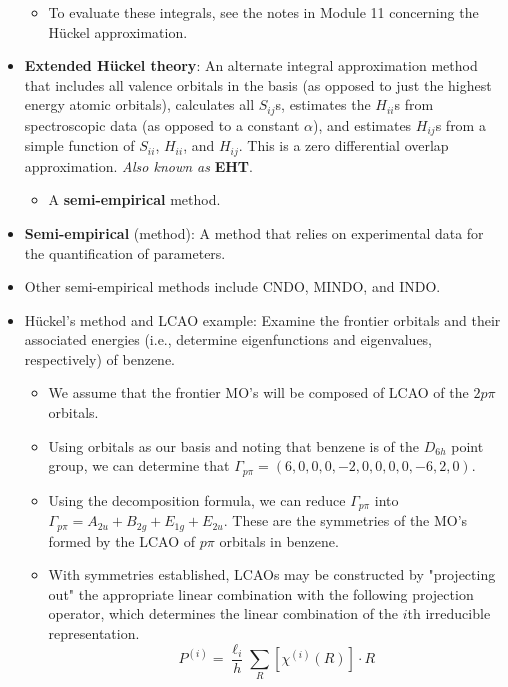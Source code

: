 \documentclass[../notes.tex]{subfiles}
\begin{document}
\begin{itemize}
\begin{itemize}
        \item To evaluate these integrals, see the notes in Module 11 concerning the H\"{u}ckel approximation.
    \end{itemize}
    \item \textbf{Extended H\"{u}ckel theory}: An alternate integral approximation method that includes all valence orbitals in the basis (as opposed to just the highest energy atomic orbitals), calculates all $S_{ij}$s, estimates the $H_{ii}$s from spectroscopic data (as opposed to a constant $\alpha$), and estimates $H_{ij}$s from a simple function of $S_{ii}$, $H_{ii}$, and $H_{ij}$. This is a zero differential overlap approximation. \emph{Also known as} \textbf{EHT}.
    \begin{itemize}
        \item A \textbf{semi-empirical} method.
    \end{itemize}
    \item \textbf{Semi-empirical} (method): A method that relies on experimental data for the quantification of parameters.
    \item Other semi-empirical methods include CNDO, MINDO, and INDO.
    \item H\"{u}ckel's method and LCAO example: Examine the frontier orbitals and their associated energies (i.e., determine eigenfunctions and eigenvalues, respectively) of benzene.
    \begin{itemize}
        \item We assume that the frontier MO's will be composed of LCAO of the $2p\pi$ orbitals.
        \item Using orbitals as our basis and noting that benzene is of the $D_{6h}$ point group, we can determine that $\Gamma_{p\pi}=(6,0,0,0,-2,0,0,0,0,-6,2,0)$.
        \item Using the decomposition formula, we can reduce $\Gamma_{p\pi}$ into $\Gamma_{p\pi}=A_{2u}+B_{2g}+E_{1g}+E_{2u}$. These are the symmetries of the MO's formed by the LCAO of $p\pi$ orbitals in benzene.
        \item With symmetries established, LCAOs may be constructed by "projecting out" the appropriate linear combination with the following projection operator, which determines the linear combination of the $i$th irreducible representation.
        \begin{equation*}
            P^{(i)} = \frac{\ell_i}{h}\sum_R[\chi^{(i)}(R)]\cdot R
        \end{equation*}
        \begin{itemize}

\end{itemize}
\end{itemize}
\end{itemize}
\end{document}
